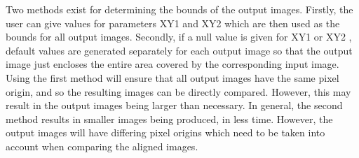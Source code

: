 \documentclass[11pt,nolof,noabs]{starlink}
\begin{document}
\begin{small}
{{      Two methods exist for determining the bounds of the output
      images.  Firstly, the user can give values for parameters XY1
      and XY2 which are then used as the bounds for all output images.
      Secondly, if a null value is given for XY1 or XY2 , default
      values are generated separately for each output image so that the
      output image just encloses the entire area covered by the
      corresponding input image. Using the first method will ensure
      that all output images have the same pixel origin, and so the
      resulting images can be directly compared. However, this may
      result in the output images being larger than necessary. In
      general, the second method results in smaller images being
      produced, in less time. However, the output images will have
      differing pixel origins which need to be taken into account when
      comparing the aligned images.

}}
\end{small}
\end{document}
